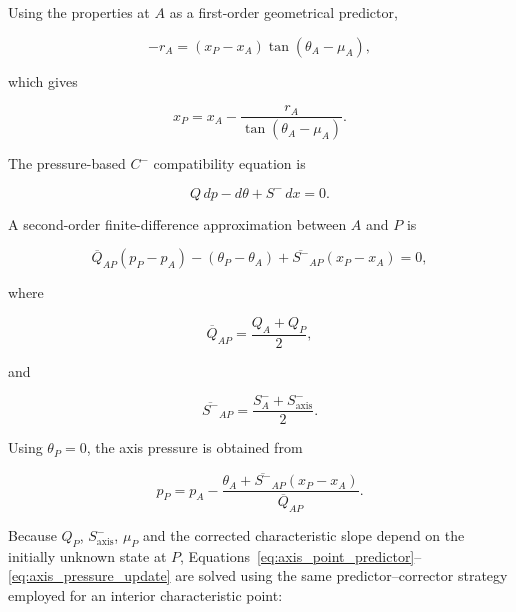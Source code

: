 Using the properties at \(A\) as a first-order geometrical predictor,

\begin{equation}
-r_A
=
(x_P-x_A)
\tan(\theta_A-\mu_A),
\end{equation}

which gives

\begin{equation}
\boxed{
x_P
=
x_A
-
\frac{r_A}
{\tan(\theta_A-\mu_A)}
}.
\label{eq:axis_point_predictor}
\end{equation}

The pressure-based \(C^-\) compatibility equation is

\begin{equation}
Q\,dp-d\theta+S^-\,dx=0.
\label{eq:Cminus_axis_compatibility}
\end{equation}

A second-order finite-difference approximation between \(A\) and \(P\)
is

\begin{equation}
\overline{Q}_{AP}(p_P-p_A)
-
(\theta_P-\theta_A)
+
\overline{S^-}_{AP}(x_P-x_A)
=
0,
\label{eq:axis_discrete_compatibility}
\end{equation}

where

\begin{equation}
\overline{Q}_{AP}
=
\frac{Q_A+Q_P}{2},
\end{equation}

and

\begin{equation}
\overline{S^-}_{AP}
=
\frac{S^-_A+S^-_{\mathrm{axis}}}{2}.
\end{equation}

Using \(\theta_P=0\), the axis pressure is obtained from

\begin{equation}
\boxed{
p_P
=
p_A
-
\frac{
\theta_A+
\overline{S^-}_{AP}(x_P-x_A)
}{
\overline{Q}_{AP}
}
}.
\label{eq:axis_pressure_update}
\end{equation}

Because \(Q_P\), \(S^-_{\mathrm{axis}}\), \(\mu_P\) and the corrected
characteristic slope depend on the initially unknown state at \(P\),
Equations~\eqref{eq:axis_point_predictor}--
\eqref{eq:axis_pressure_update} are solved using the same
predictor--corrector strategy employed for an interior characteristic
point:

